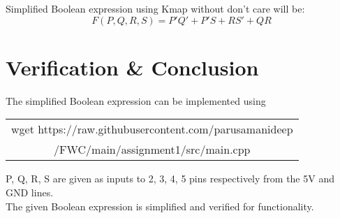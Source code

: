 \documentclass[journal,12pt,twocolumn]{IEEEtran}
\begin{document}
Simplified Boolean expression using Kmap without don't care will be:
$$F(P,Q,R,S) = P'Q' + P'S + RS' + QR$$

\section{Verification \& Conclusion}
The simplified Boolean expression can be implemented using 

\vspace{10pt}
\begin{tabular}{|c|}
    \hline

wget https://raw.githubusercontent.com/parusamanideep
\\/FWC/main/assignment1/src/main.cpp
     \\ \hline
\end{tabular}

\vspace{4pt}
P, Q, R, S are given as inputs to 2, 3, 4, 5 pins respectively from the 5V and GND lines.
\\
The given Boolean expression is simplified and verified for functionality.
\end{document}

